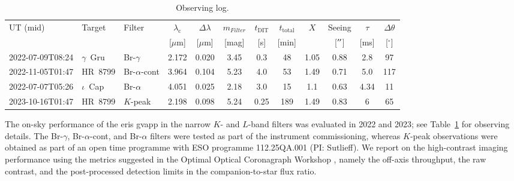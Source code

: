 \documentclass{aa}
\begin{document}
\begin{table}
    \centering
         \caption{Observing log.}
    \renewcommand*{\arraystretch}{1.2}
     \begin{tabular}{l l l c c c c c c c c c}
        \hline
        UT (mid) & Target & Filter & $\lambda_{\mathrm{c}}$ & $\Delta \lambda$ & $m_{Filter}$ & $t_{\mathrm{DIT}}$ & $t_{\mathrm{total}}$ & $X$ & Seeing & $\tau$ & $\Delta\theta$ \\
         & ~ & ~ & [$\mu$m] & [$\mu$m] & [mag] & [s] & [min] & ~ & [$^{\prime\prime}$] & [ms] &  [$^{\circ}$] \\
        \hline
        2022-07-09T08:24 & $\gamma$~Gru & Br-$\gamma$      & 2.172 & 0.020 & 3.45 & 0.3 & 48  & 1.05 & 0.88 & 2.8  & 97 \\
        2022-11-05T01:47 & HR~8799      & Br-$\alpha$-cont & 3.964 & 0.104 & 5.23 & 4.0 & 53  & 1.49 & 0.71 & 5.0  & 117 \\
        2022-07-07T05:26 & $\iota$~Cap  & Br-$\alpha$      & 4.051 & 0.025 & 2.18 & 3.0 & 15  & 1.1  & 0.63 & 4.34 & 11 \\
        2023-10-16T01:47& HR~8799      & $K$-peak           & 2.198 & 0.098 & 5.24 & 0.25 & 189 & 1.49 & 0.83 & 6    & 65 \\
        \hline
     \end{tabular}
    
\label{tab:ppc_obs_log}
\end{table}

The on-sky performance of the \ac{eris} \ac{gvapp} in the narrow $K$- and $L$-band filters was evaluated in 2022 and 2023; see Table~\ref{tab:ppc_obs_log} for observing details.
%
The Br-$\gamma$, Br-$\alpha$-cont, and Br-$\alpha$ filters were tested as part of the instrument commissioning, whereas $K$-peak observations were obtained as part of an open time programme with ESO programme 112.25QA.001 (PI: Sutlieff).
%
We report on the high-contrast imaging performance using the metrics suggested in the Optimal Optical Coronagraph Workshop \citep{2018SPIE10698E..2SR}, namely the off-axis throughput, the raw contrast, and the post-processed detection limits in the companion-to-star flux ratio.
\end{document}

